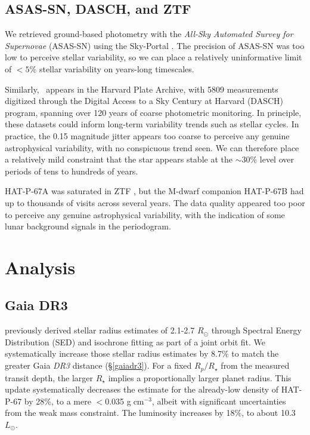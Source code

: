 \documentclass[linenumbers, twocolumn, trackchanges]{aastex631}
\newcommand{\hatp}{\object{HAT-P-67}~}
\begin{document}
\subsection{ASAS-SN, DASCH, and ZTF}
We retrieved ground-based photometry with the \emph{All-Sky Automated Survey for Supernovae} (ASAS-SN) using the Sky-Portal \citep{shappee14,2017PASP..129j4502K}.  The precision of ASAS-SN was too low to perceive stellar variability, so we can place a relatively uninformative limit of $<5\%$ stellar variability on years-long timescales.

Similarly, \hatp appears in the Harvard Plate Archive, with 5809 measurements digitized through the Digital Access to a Sky Century at Harvard (DASCH) program, spanning over 120 years of coarse photometric monitoring.  In principle, these datasets could inform long-term variability trends such as stellar cycles.  In practice, the 0.15 magnitude jitter appears too coarse to perceive any genuine astrophysical variability, with no conspicuous trend seen.  We can therefore place a relatively mild constraint that the star appears stable at the $\sim30\%$ level over periods of tens to hundreds of years.

HAT-P-67A was saturated in ZTF \citep{2019PASP..131a8002B}, but the M-dwarf companion HAT-P-67B had up to thousands of visits across several years.  The data quality appeared too poor to perceive any genuine astrophysical variability, with the indication of some lunar background signals in the periodogram.


\section{Analysis} \label{secAnalysis}

\subsection{Gaia DR3}\label{analysisgaiaDR3}
\citet{2017AJ....153..211Z} previously derived stellar radius estimates of 2.1-2.7 $R_\odot$ through Spectral Energy Distribution (SED) and isochrone fitting as part of a joint orbit fit.  We systematically increase those stellar radius estimates by 8.7\% to match the greater Gaia \emph{DR3} distance (\S \ref{gaiadr3}).  For a fixed $R_p/R_\star$ from the measured transit depth, the larger $R_\star$ implies a proportionally larger planet radius. This update systematically decreases the estimate for the already-low density of HAT-P-67 by 28\%, to a mere $<$0.035 g$\;$cm$^{-3}$, albeit with significant uncertainties from the weak mass constraint.  The luminosity increases by 18\%, to about 10.3 $L_\odot$.
\end{document}
